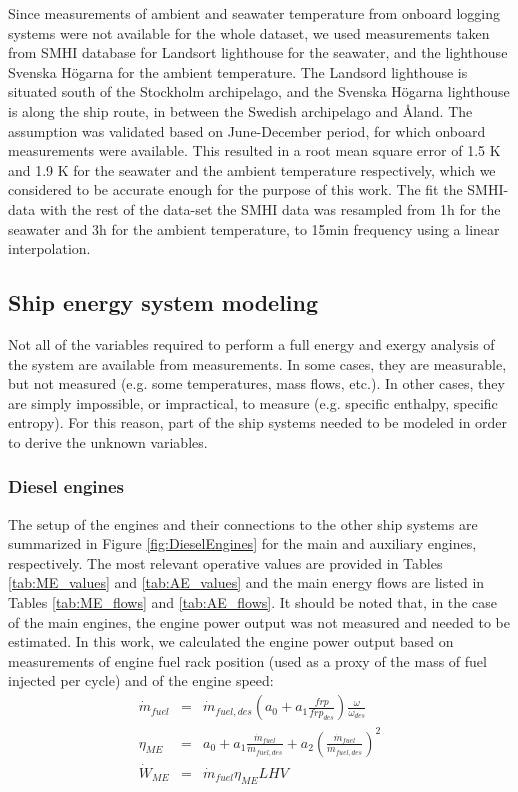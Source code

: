 \documentclass[preprint,12pt]{elsarticle}
\begin{document}
Since measurements of ambient and seawater temperature from onboard logging systems were not available for the whole dataset, we used measurements taken from SMHI database for Landsort lighthouse for the seawater, and the lighthouse Svenska H\"{o}garna for the ambient temperature. The Landsord lighthouse is situated south of the Stockholm archipelago, and the Svenska H\"{o}garna lighthouse is along the ship route, in between the Swedish archipelago and Åland. The assumption was validated based on  June-December period, for which onboard measurements were available. This resulted in a root mean square error of 1.5 K and 1.9 K for the seawater and the ambient temperature respectively, which we considered to be accurate enough for the purpose of this work. The fit the SMHI-data with the rest of the data-set the SMHI data was resampled from 1h for the seawater and 3h for the ambient temperature, to 15min frequency using a linear interpolation.

\subsection{Ship energy system modeling} \label{sec:met:processing}

Not all of the variables required to perform a full energy and exergy analysis of the system are available from measurements. In some cases, they are measurable, but not measured (e.g. some temperatures, mass flows, etc.). In other cases, they are simply impossible, or impractical, to measure (e.g. specific enthalpy, specific entropy). For this reason, part of the ship systems needed to be modeled in order to derive the unknown variables. 




\subsubsection{Diesel engines}

The setup of the engines and their connections to the other ship systems are summarized in Figure \ref{fig:DieselEngines} for the main and auxiliary engines, respectively. The most relevant operative values are provided in Tables \ref{tab:ME_values} and \ref{tab:AE_values} and the main energy flows are listed in Tables \ref{tab:ME_flows} and \ref{tab:AE_flows}. It should be noted that, in the case of the main engines, the engine power output was not measured and needed to be estimated. In this work, we calculated the engine power output based on measurements of engine fuel rack position (used as a proxy of the mass of fuel injected per cycle) and of the engine speed:
\begin{eqnarray}
\dot{m}_{fuel} & = & \dot{m}_{fuel,des} \left(a_0 + a_1 \frac{frp}{frp_{des}}\right) \frac{\omega}{\omega_{des}} \\
\eta_{ME} & = & a_0 + a_1 \frac{\dot{m}_{fuel}}{\dot{m}_{fuel,des}} + a_2 \left( \frac{\dot{m}_{fuel}}{\dot{m}_{fuel,des}} \right)^2 \\
\dot{W}_{ME} & = & \dot{m}_{fuel} \eta_{ME} LHV
\end{eqnarray}
\end{document}
